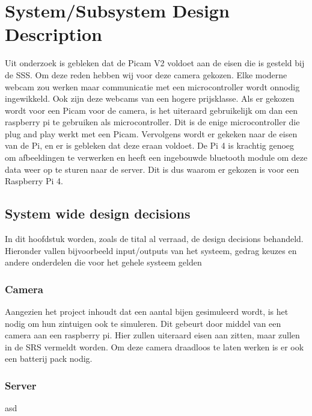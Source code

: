 \section{System/Subsystem Design Description}


Uit onderzoek is gebleken dat de Picam V2 voldoet aan de eisen die is gesteld bij de SSS.
Om deze reden hebben wij voor deze camera gekozen. Elke moderne webcam zou werken maar communicatie met een
microcontroller wordt onnodig ingewikkeld. Ook zijn deze webcams van een hogere prijsklasse.
Als er gekozen wordt voor een Picam voor de camera, is het uiteraard gebruikelijk om dan een raspberry pi
te gebruiken als microcontroller. Dit is de enige microcontroller die plug and play werkt met een Picam.
Vervolgens wordt er gekeken naar de eisen van de Pi, en er is gebleken dat deze eraan voldoet.
De Pi 4 is krachtig genoeg om afbeeldingen te verwerken en heeft een ingebouwde bluetooth module
om deze data weer op te sturen naar de server. Dit is dus waarom er gekozen is voor een Raspberry Pi 4.

\subsection{System wide design decisions}
In dit hoofdstuk worden, zoals de tital al verraad, de design decisions behandeld. Hieronder vallen bijvoorbeeld
input/outputs van het systeem, gedrag keuzes en andere onderdelen die voor het gehele systeem gelden


\subsubsection*{Camera}
Aangezien het project inhoudt dat een aantal bijen gesimuleerd wordt, is het nodig om hun zintuigen ook te simuleren. Dit gebeurt door middel van een camera aan een raspberry pi. Hier zullen uiteraard eisen aan zitten, maar zullen in de SRS vermeldt worden. Om deze camera draadloos te laten werken is er ook een batterij pack nodig.

\subsubsection*{Server}
asd
\newline

